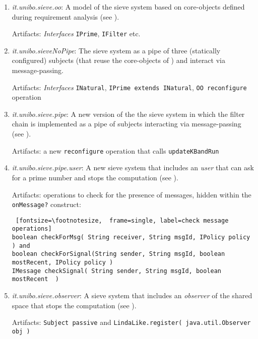 \documentclass{../llncs}
\begin{document}
\begin{enumerate}
\item \textit{it.unibo.sieve.oo}:  A model of the sieve system based on core-objects defined during requirement analysis (see ).

\medskip 
Artifacts: \textit{Interfaces} \texttt{IPrime}, \texttt{IFilter} etc.
\medskip 
\item \textit{it.unibo.sieveNoPipe}: The sieve system as a pipe of three (statically configured) subjects (that reuse the core-objects of ) and interact via message-passing.

\medskip 
Artifacts: \textit{Interfaces}  \texttt{INatural}, \texttt{IPrime extends INatural}, \texttt{OO reconfigure} operation
\medskip 
\item \textit{it.unibo.sieve.pipe}: A new version of the the sieve system in which the filter chain is implemented as a pipe of subjects interacting via message-passing (see ).

\medskip 
Artifacts: a new \texttt{reconfigure} operation that calls \texttt{updateKBandRun}
\medskip 

\item \textit{it.unibo.sieve.pipe.user}: A new sieve system that includes an \textit{user} that can ask for a prime number and stops the computation (see ).

\medskip 
Artifacts: operations to check for the presence of messages, hidden within the \texttt{onMessage?} construct:
\medskip 
\begin{Verbatim} [fontsize=\footnotesize,  frame=single, label=check message operations] 
boolean checkForMsg( String receiver, String msgId, IPolicy policy  ) and 
boolean checkForSignal(String sender, String msgId, boolean mostRecent, IPolicy policy ) 
IMessage checkSignal( String sender, String msgId, boolean mostRecent  )
\end{Verbatim}

\medskip 

\item \textit{it.unibo.sieve.observer}: A sieve system that includes an \textit{observer} of the shared space that stops the computation (see ).

\medskip 
Artifacts: \texttt{Subject passive} and \texttt{LindaLike.register( java.util.Observer obj )}
\medskip 



\end{enumerate}
\sloppy
\tableofcontents
\end{document}
